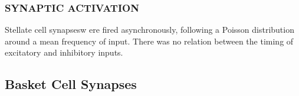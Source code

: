 \documentclass[12pt]{article}
\begin{document}
\subsubsection*{SYNAPTIC ACTIVATION}
Stellate cell synapsesw ere fired asynchronously,
following a Poisson distribution around a mean frequency
of input. There was no relation between the timing of
excitatory and inhibitory inputs.

\subsection*{Basket Cell Synapses}



\end{document}
